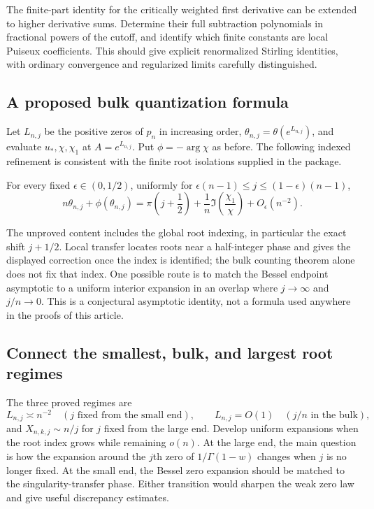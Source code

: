 The finite-part identity for the critically weighted first derivative
can be extended to higher derivative sums. Determine their full
subtraction polynomials in fractional powers of the cutoff, and
identify which finite constants are local Puiseux coefficients.
This should give explicit renormalized Stirling identities, with
ordinary convergence and regularized limits carefully distinguished.

\subsection{A proposed bulk quantization formula}

Let $L_{n,j}$ be the positive zeros of $p_n$ in increasing order,
$\theta_{n,j}=\theta(e^{L_{n,j}})$, and evaluate $u_*,\chi,\chi_1$
at $A=e^{L_{n,j}}$. Put $\phi=-\arg\chi$ as before.
The following indexed refinement is consistent with the finite root
isolations supplied in the package.

\begin{conjecture}
\label{conj:bulk-quantization}
For every fixed $\epsilon\in(0,1/2)$, uniformly for
$\epsilon(n-1)\leq j\leq(1-\epsilon)(n-1)$,
\begin{equation}\label{eq:bulk-quantization-conjecture}
 n\theta_{n,j}+\phi(\theta_{n,j})
 =\pi\left(j+\frac12\right)
   +\frac1n\Im\left(\frac{\chi_1}{\chi}\right)
   +O_\epsilon(n^{-2}).
\end{equation}
\end{conjecture}

The unproved content includes the global root indexing, in particular
the exact shift $j+1/2$. Local transfer locates roots near a half-integer
phase and gives the displayed correction once the index is identified;
the bulk counting theorem alone does not fix that index. One possible
route is to match the Bessel endpoint asymptotic to a uniform interior
expansion in an overlap where $j\to\infty$ and $j/n\to0$.
This is a conjectural asymptotic identity, not a formula used anywhere
in the proofs of this article.

\subsection{Connect the smallest, bulk, and largest root regimes}

The three proved regimes are
\[
 L_{n,j}\asymp n^{-2}\quad(j\text{ fixed from the small end}),
 \qquad L_{n,j}=O(1)\quad(j/n\text{ in the bulk}),
\]
and $X_{n,k,j}\sim n/j$ for $j$ fixed from the large end.
Develop uniform expansions when the root index grows while remaining
$o(n)$. At the large end, the main question is how the expansion around
the $j$th zero of $1/\Gamma(1-w)$ changes when $j$ is no longer fixed.
At the small end, the Bessel zero expansion should be matched to the
singularity-transfer phase. Either transition would sharpen the weak
zero law and give useful discrepancy estimates.

